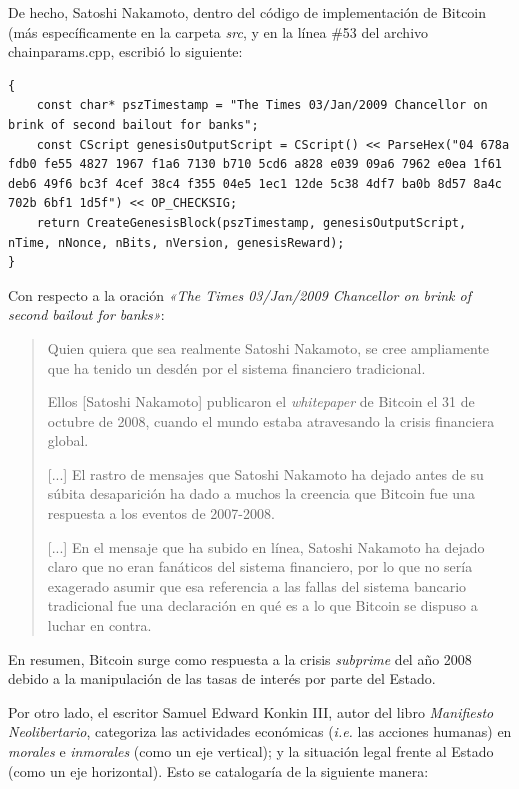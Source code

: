 \documentclass[12pt,a4paper,twoside]{book}
\begin{document}
De hecho, Satoshi Nakamoto, dentro del código de implementación de Bitcoin (más específicamente en la carpeta \textit{src}, y en la línea \#53 del archivo chainparams.cpp, escribió lo siguiente:

\lstset{language=c++, firstnumber=52, showstringspaces=false, numbers=left, breaklines=true}
\begin{lstlisting}
{
    const char* pszTimestamp = "The Times 03/Jan/2009 Chancellor on brink of second bailout for banks";
    const CScript genesisOutputScript = CScript() << ParseHex("04 678a fdb0 fe55 4827 1967 f1a6 7130 b710 5cd6 a828 e039 09a6 7962 e0ea 1f61 deb6 49f6 bc3f 4cef 38c4 f355 04e5 1ec1 12de 5c38 4df7 ba0b 8d57 8a4c 702b 6bf1 1d5f") << OP_CHECKSIG;
    return CreateGenesisBlock(pszTimestamp, genesisOutputScript, nTime, nNonce, nBits, nVersion, genesisReward);
}
\end{lstlisting}

Con respecto a la oración \textit{«The Times 03/Jan/2009 Chancellor on brink of second bailout for banks»}:

\begin{quotation}

Quien quiera que sea realmente Satoshi Nakamoto, se cree ampliamente que ha tenido un desdén por el sistema financiero tradicional.

Ellos [Satoshi Nakamoto] publicaron el \textit{whitepaper} de Bitcoin el 31 de octubre de 2008, cuando el mundo estaba atravesando la crisis financiera global.

[...] El rastro de mensajes que Satoshi Nakamoto ha dejado antes de su súbita desaparición ha dado a muchos la creencia que Bitcoin fue una respuesta a los eventos de 2007-2008.

[...] En el mensaje que ha subido en línea, Satoshi Nakamoto ha dejado claro que no eran fanáticos del sistema financiero, por lo que no sería exagerado asumir que esa referencia a las fallas del sistema bancario tradicional fue una declaración en qué es a lo que Bitcoin se dispuso a luchar en contra. \cite{satoshi:genesis}
\end{quotation}

En resumen, Bitcoin surge como respuesta a la crisis \textit{subprime} del año 2008 debido a la manipulación de  las tasas de interés por parte del Estado.

Por otro lado, el escritor Samuel Edward Konkin III, autor del libro \textit{Manifiesto Neolibertario}, categoriza las actividades económicas (\textit{i.e.} las acciones humanas) en \textit{morales} e \textit{inmorales} (como un eje vertical); y la situación legal frente al Estado (como un eje horizontal). Esto se catalogaría de la siguiente manera:
\end{document}
